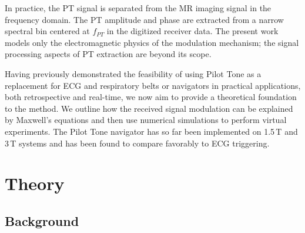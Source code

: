 \documentclass[
]{article}
\begin{document}
In practice, the PT signal is separated from the MR imaging signal in the frequency domain. The PT amplitude and phase are extracted from a narrow spectral bin centered at $f_{PT}$ in the digitized receiver data. The present work models only the electromagnetic physics of the modulation mechanism; the signal processing aspects of PT extraction are beyond its scope.

Having previously demonstrated \cite{Vahle2020RespiratoryTone, Bacher2018PilotCine, Bacher2017RetrospectiveCohort, Bacher2017CardiacStudy} the feasibility of using
Pilot Tone as a replacement for ECG and respiratory belts or navigators
in practical applications, both retrospective and real-time, we now aim
to provide a theoretical foundation to the method. We outline how the
received signal modulation can be explained by Maxwell's equations and
then use numerical simulations to perform virtual experiments. The Pilot
Tone navigator has so far been implemented on 1.5\,T and 3\,T systems and
has been found to compare favorably to ECG triggering. \cite{Bacher2020PerformanceFramework, Qian2025ComparisonStudy, Mizuno2024ClinicalLeads, Chen2023CardiacStudy}

\section{Theory}\label{theory}

\subsection{Background}\label{background}
\end{document}
